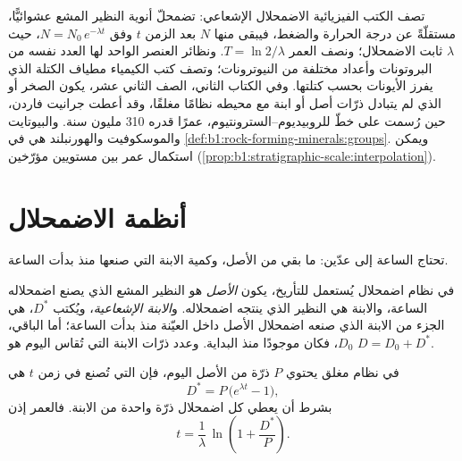 \begin{recall}
تصف الكتب الفيزيائية الاضمحلال الإشعاعي: تضمحلّ أنوية النظير المشع عشوائيًّا، مستقلّةً عن درجة الحرارة والضغط، فيبقى منها $N$ بعد الزمن $t$ وفق $N = N_0\,e^{-\lambda t}$، حيث $\lambda$ ثابت الاضمحلال؛ ونصف العمر $T = \ln 2/\lambda$. ونظائر العنصر الواحد لها العدد نفسه من البروتونات وأعداد مختلفة من النيوترونات؛ وتصف كتب الكيمياء مطياف الكتلة الذي يفرز الأيونات بحسب كتلتها. وفي الكتاب الثاني، الصف الثاني عشر، يكون الصخر أو  الذي لم يتبادل ذرّات أصل أو ابنة مع محيطه نظامًا مغلقًا، وقد أعطت  جرانيت فاردن، حين رُسمت على خطّ  للروبيديوم–السترونتيوم، عمرًا قدره 310 مليون سنة. والبيوتايت والموسكوفيت والهورنبلند هي   في \cref{def:b1:rock-forming-minerals:groups}. ويمكن استكمال عمر بين مستويين مؤرّخين (\cref{prop:b1:stratigraphic-scale:interpolation}).
\end{recall}

\section{أنظمة الاضمحلال}\label{sec:b1:radiometric-methods:systems}

تحتاج الساعة إلى عدّين: ما بقي من الأصل، وكمية الابنة التي صنعها منذ بدأت الساعة.

\begin{definition}\label{def:b1:radiometric-methods:radiogenic}
في نظام اضمحلال يُستعمل للتأريخ، يكون \emph{الأصل} هو النظير المشع الذي يصنع اضمحلاله الساعة، والابنة هي النظير الذي ينتجه اضمحلاله. و\emph{الابنة الإشعاعية}، ويُكتب $D^*$، هي الجزء من الابنة الذي صنعه اضمحلال الأصل داخل العيّنة منذ بدأت الساعة؛ أما الباقي، $D_0$، فكان موجودًا منذ البداية. وعدد ذرّات الابنة التي تُقاس اليوم هو $D = D_0 + D^*$.
\end{definition}

\begin{proposition}\label{prop:b1:radiometric-methods:growth}
في نظام مغلق يحتوي $P$ ذرّة من الأصل اليوم، فإن  التي تُصنع في زمن $t$ هي
\[
  D^* = P\,\bigl(e^{\lambda t} - 1\bigr),
\]
بشرط أن يعطي كل اضمحلال ذرّة واحدة من الابنة. فالعمر إذن
\[
  t = \frac{1}{\lambda}\,\ln\!\left(1 + \frac{D^*}{P}\right).
\]
\end{proposition}

